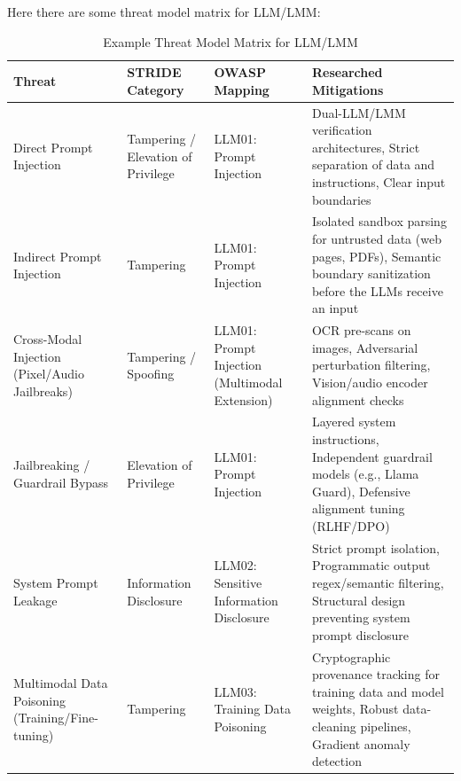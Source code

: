 \documentclass[a4paper,12pt]{report}
\begin{document}
Here there are some threat model matrix for LLM/LMM:
\begin{table}[ht]
\centering
\caption{Example Threat Model Matrix for LLM/LMM}
\label{tab:threat_model_matrix}
\renewcommand{\arraystretch}{1.15}
\small
\begin{tabularx}{\textwidth}{|p{2.8cm}|p{2.5cm}|p{2.8cm}|X|}
\hline
\textbf{Threat} &
\textbf{STRIDE Category} &
\textbf{OWASP Mapping} &
\textbf{Researched Mitigations} \\
\hline
Direct Prompt Injection &
Tampering / Elevation of Privilege &
LLM01: Prompt Injection &
Dual-LLM/LMM verification architectures, Strict separation of data and instructions, Clear input boundaries \\
\hline
Indirect Prompt Injection &
Tampering &
LLM01: Prompt Injection &
Isolated sandbox parsing for untrusted data (web pages, PDFs), Semantic boundary sanitization before the LLMs receive an input \\
\hline
Cross-Modal Injection (Pixel/Audio Jailbreaks) &
Tampering / Spoofing &
LLM01: Prompt Injection (Multimodal Extension) &
OCR pre-scans on images, Adversarial perturbation filtering, Vision/audio encoder alignment checks \\
\hline
Jailbreaking / Guardrail Bypass &
Elevation of Privilege &
LLM01: Prompt Injection &
Layered system instructions, Independent guardrail models (e.g., Llama Guard), Defensive alignment tuning (RLHF/DPO) \\
\hline
System Prompt Leakage &
Information Disclosure &
LLM02: Sensitive Information Disclosure &
Strict prompt isolation, Programmatic output regex/semantic filtering, Structural design preventing system prompt disclosure \\
\hline
Multimodal Data Poisoning (Training/Fine-tuning) &
Tampering &
LLM03: Training Data Poisoning &
Cryptographic provenance tracking for training data and model weights, Robust data-cleaning pipelines, Gradient anomaly detection \\
\hline
\end{tabularx}
\end{table}
\end{document}
